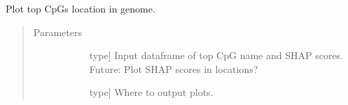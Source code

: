 \documentclass[letterpaper,10pt,english]{sphinxmanual}
\begin{document}
\begin{fulllineitems}
\begin{fulllineitems}
\label{\detokenize{index:methylnet.interpretation_classes.PlotCircos.plot_cpgs}}
Plot top CpGs location in genome.
\begin{quote}\begin{description}
\item[{Parameters}] \leavevmode\begin{description}
\item[{}] \leavevmode{[}type{]}
Input dataframe of top CpG name and SHAP scores. Future: Plot SHAP scores in locations?

\item[{}] \leavevmode{[}type{]}
Where to output plots.

\end{description}

\end{description}\end{quote}

\end{fulllineitems}


\end{fulllineitems}

\end{document}
